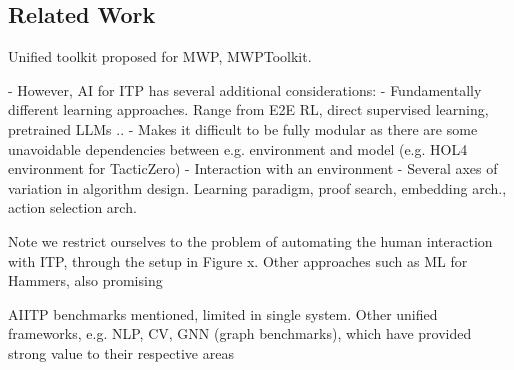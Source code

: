 \documentclass[letterpaper]{article} %
\begin{document}






    \subsection{Related Work}
    Unified toolkit proposed for MWP, MWPToolkit.

    - However, AI for ITP has several additional considerations:
    - Fundamentally different learning approaches. Range from E2E RL, direct supervised learning, pretrained LLMs ..
    - Makes it difficult to be fully modular as there are some unavoidable dependencies between e.g. environment and
    model (e.g. HOL4 environment for TacticZero)
    - Interaction with an environment
    - Several axes of variation in algorithm design. Learning paradigm, proof search, embedding arch., action selection
    arch.

    Note we restrict ourselves to the problem of automating the human interaction with ITP, through the setup in Figure x.
    Other approaches such as ML for Hammers, also promising

    AIITP benchmarks mentioned, limited in single system.
    Other unified frameworks, e.g. NLP, CV, GNN (graph benchmarks), which have provided strong value to their respective areas
\end{document}
